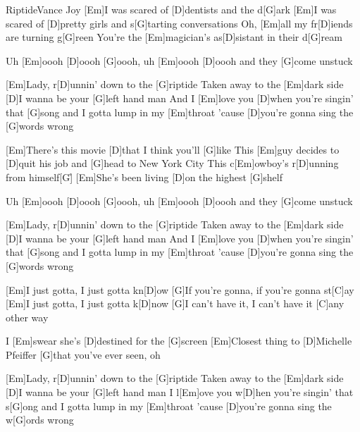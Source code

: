 \documentclass[../main.tex]{subfiles}
\begin{document}
\begin{song}[6]{Riptide}{Vance Joy}{}
[Em]I was scared of [D]dentists and the d[G]ark
[Em]I was scared of [D]pretty girls and s[G]tarting conversations
Oh, [Em]all my fr[D]iends are turning g[G]reen
You're the [Em]magician's as[D]sistant in their d[G]ream

Uh [Em]oooh [D]oooh  [G]oooh, uh [Em]oooh [D]oooh and they [G]come unstuck

[Em]Lady, r[D]unnin' down to the [G]riptide
Taken away to the [Em]dark side
[D]I wanna be your [G]left hand man
And I [Em]love you [D]when you're singin' that [G]song and
I gotta lump in my [Em]throat 'cause [D]you're gonna sing the [G]words wrong

[Em]There's this movie [D]that I think you'll [G]like
This [Em]guy decides to [D]quit his job and [G]head to New York City
This c[Em]owboy's r[D]unning from himself[G]{\h}
[Em]She's been living [D]on the highest [G]shelf

Uh [Em]oooh [D]oooh  [G]oooh, uh [Em]oooh [D]oooh and they [G]come unstuck

[Em]Lady, r[D]unnin' down to the [G]riptide
Taken away to the [Em]dark side
[D]I wanna be your [G]left hand man
And I [Em]love you [D]when you're singin' that [G]song and
I gotta lump in my [Em]throat 'cause [D]you're gonna sing the [G]words wrong

[Em]I just gotta, I just gotta kn[D]ow
[G]If you're gonna, if you're gonna st[C]ay
[Em]I just gotta, I just gotta k[D]now
[G]I can't have it, I can't have it [C]any other way

I [Em]swear she's [D]destined for the [G]screen
[Em]Closest thing to [D]Michelle Pfeiffer [G]that you've ever seen, oh

[Em]Lady, r[D]unnin' down to the [G]riptide
Taken away to the [Em]dark side
[D]I wanna be your [G]left hand man
I l[Em]ove you w[D]hen you're singin' that s[G]ong and
I gotta lump in my [Em]throat 'cause [D]you're gonna sing the w[G]ords wrong
\end{song}
\end{document}
